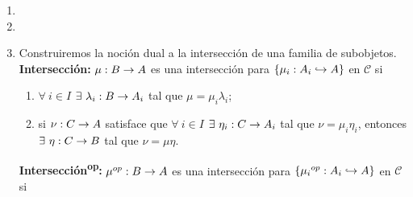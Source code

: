 \documentclass{article}
\begin{document}
\begin{enumerate}[label=\textbf{Ej \arabic*.}]
\begin{proof}
			 Ahora supongamos que $\catarrow{\alpha}{M}{N}{}$ es epi en $Mod\lrprth{R}$ y denotemos por $\beta$ al morfismo inclusión de $Ker\lrprth{\alpha}$ en $M$. Afirmamos que $\alpha$ es un cokernel para $\beta$, en efecto:\\
			Como $Ker\lrprth{\alpha}=\lrbrack{m\in M\ \vline\ \alpha\lrprth{m}=0_N}$, entonces $\alpha\beta=0$. Sea $\catarrow{\alpha'}{M}{N'}{}$ en $Mod\lrprth{R}$ tal que $\alpha'\beta=0$, así 
			\begin{equation*}
				Ker\lrprth{\alpha'}\supseteq Im\lrprth{\beta}=Ker\lrprth{\alpha}.
			\end{equation*}
			Como $\alpha$ es epi se tiene que $N=Im\lrprth{\alpha}$. Así, consideremos la aplicación
			\begin{align*}
				\descapp{\gamma}{N}{N'}{\alpha\lrprth{m}}{\alpha'\lrprth{m}}{,}
			\end{align*}
			la cual es una función bien definida, puesto que si $m,o\in M$ son tales que $\alpha\lrprth{m}=\alpha\lrprth{o}$, entonces
			\begin{align*}
				m-o&\in Ker\lrprth{\alpha}\subseteq Ker\lrprth{\alpha'}\\
				\implies \alpha'\lrprth{m}&=\alpha'\lrprth{o}.
			\end{align*}
			Más aún, es un morfismo de $R$-módulos, pues $\alpha$ y $\alpha'$ lo son, que satisface que $\gamma\alpha=\alpha'$. Finalmente $\gamma$ es el único morfismo de $R$-módulos que satisface la igualdad anterior dado que $\alpha$ es epi.\\
		\end{proof}
		\item 
		\item 
		\item Construiremos la noción dual a la intersección de una familia de subobjetos.\\
		\textbf{Intersección:} $\catarrow{\mu}{B}{A}{}$ es una intersección para $\lrbrack{\catarrow{\mu_i}{A_i}{A}{m}}$ en $\mathscr{C}$ si \begin{enumerate}[label=Int\Roman*)]
			\item $\forall\ i\in I$ $\exists\ \catarrow{\lambda_i}{B}{A_i}{}$ tal que $\mu=\mu_i\lambda_i$;
			\item si $\catarrow{\nu}{C}{A}{}$ satisface que $\forall\ i\in I$ $\exists\ \catarrow{\eta_i}{C}{A_i}{}$ tal que $\nu=\mu_i\eta_i$, entonces $\exists\ \catarrow{\eta}{C}{B}{}$ tal que $\nu=\mu\eta$.
		\end{enumerate}
		\textbf{Intersección\textsuperscript{op}:} $\catarrow{\opst{\mu}}{B}{A}{}$ es una intersección para $\lrbrack{\catarrow{\opst{\mu_i}}{A_i}{A}{m}}$ en $\mathscr{C}$ si\begin{enumerate}[label=Int\textsuperscript{op}\Roman*)]

\end{enumerate}
\end{enumerate}
\end{document}
